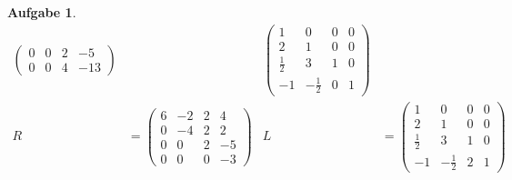 \documentclass[11pt]{article}
\theoremstyle{break}
\newtheorem{task}{Aufgabe}
\begin{document}
\begin{task}
\begin{align*}
\begin{pmatrix}
            0 & 0 & 2 & -5 \\
            0 & 0 & 4 & -13
        \end{pmatrix} && 
        \begin{pmatrix}
            1 & 0 & 0 & 0 \\
            2 & 1 & 0 & 0 \\
            \frac{1}{2} & 3 & 1 & 0 \\
            -1 & -\frac{1}{2} & 0 & 1 
        \end{pmatrix}\\
        R &= \begin{pmatrix}
            6 & -2 & 2 & 4 \\
            0 & -4 & 2 & 2 \\
            0 & 0 & 2 & -5 \\
            0 & 0 & 0 & -3
        \end{pmatrix} & L &= 
        \begin{pmatrix}
            1 & 0 & 0 & 0 \\
            2 & 1 & 0 & 0 \\
            \frac{1}{2} & 3 & 1 & 0 \\
            -1 & -\frac{1}{2} & 2 & 1 
        \end{pmatrix}
    \end{align*}
\end{task}
\newpage
\end{document}
